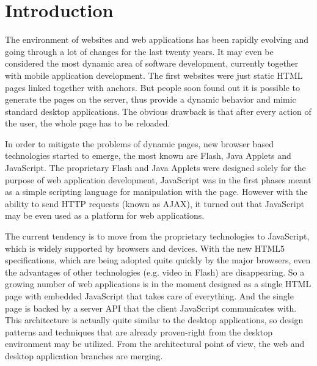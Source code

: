 \documentclass[12pt,a4paper]{report}
\begin{document}
\newpage
\pagestyle{plain}
\setcounter{page}{1}
\tableofcontents



\chapter{Introduction}

The environment of websites and web applications has been rapidly evolving and going through a lot of changes for the last twenty years. It may even be considered the most dynamic area of software development, currently together with mobile application development. The first websites were just static HTML pages linked together with anchors. But people soon found out it is possible to generate the pages on the server, thus provide a dynamic behavior and mimic standard desktop applications. The obvious drawback is that after every action of the user, the whole page has to be reloaded. 

In order to mitigate the problems of dynamic pages, new browser based technologies started to emerge, the most known are Flash\cite{Flash}, Java Applets\cite{JavaApplets} and JavaScript\cite{JavaScript}\cite{EcmaScript}. The proprietary Flash and Java Applets were designed solely for the purpose of web application development, JavaScript was in the first phases meant as a simple scripting language for manipulation with the page. However with the ability to send HTTP requests (known as AJAX\cite{Ajax}), it turned out that JavaScript may be even used as a platform for web applications. 

The current tendency is to move from the proprietary technologies to JavaScript, which is widely supported by browsers and devices. With the new HTML5\cite{Html5} specifications, which are being adopted quite quickly by the major browsers, even the advantages of other technologies (e.g. video in Flash) are disappearing. So a growing number of web applications is in the moment designed as a single HTML page with embedded JavaScript that takes care of everything. And the single page is backed by a server API that the client JavaScript communicates with. This architecture is actually quite similar to the desktop applications, so design patterns and techniques that are already proven-right from the desktop environment may be utilized. From the architectural point of view, the web and desktop application branches are merging.
\end{document}

